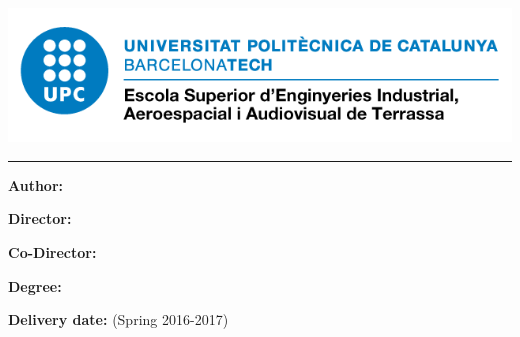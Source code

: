 
\thispagestyle{CoverPage}

\begin{center}
\includegraphics[scale=0.5]{./doc_config/image}\par
\vspace{1cm}
{\scshape\Large \School \par}
\vspace{1cm}
{\huge\bfseries \ProjectName\par}
\textcolor{cyan}{\rule{\textwidth}{.6pt}}
\vspace{2cm}
{\Large \DocType\par}
\vfill
\end{center}

\vspace{10pt}
\textbf{Author:} \Author

\textbf{Director:} \Director

\textbf{Co-Director:} \Codirector

\textbf{Degree:} \Degree

\textbf{Delivery date:} \DocDate  (Spring 2016-2017)
\vspace{10pt}